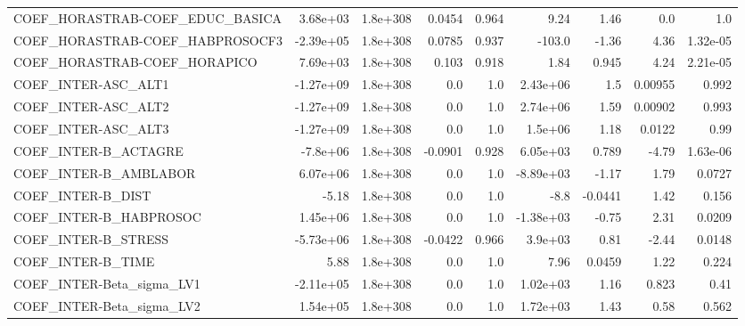 \begin{tabular}{lrrrrrrrr}
COEF\_HORASTRAB-COEF\_EDUC\_BASICA   &    3.68e+03 &     1.8e+308 &  0.0454 &    0.964 &       9.24 &        1.46 &          0.0 &           1.0 \\
COEF\_HORASTRAB-COEF\_HABPROSOCF3   &   -2.39e+05 &     1.8e+308 &  0.0785 &    0.937 &     -103.0 &       -1.36 &         4.36 &      1.32e-05 \\
COEF\_HORASTRAB-COEF\_HORAPICO      &    7.69e+03 &     1.8e+308 &   0.103 &    0.918 &       1.84 &       0.945 &         4.24 &      2.21e-05 \\
COEF\_INTER-ASC\_ALT1               &   -1.27e+09 &     1.8e+308 &     0.0 &      1.0 &   2.43e+06 &         1.5 &      0.00955 &         0.992 \\
COEF\_INTER-ASC\_ALT2               &   -1.27e+09 &     1.8e+308 &     0.0 &      1.0 &   2.74e+06 &        1.59 &      0.00902 &         0.993 \\
COEF\_INTER-ASC\_ALT3               &   -1.27e+09 &     1.8e+308 &     0.0 &      1.0 &    1.5e+06 &        1.18 &       0.0122 &          0.99 \\
COEF\_INTER-B\_ACTAGRE              &    -7.8e+06 &     1.8e+308 & -0.0901 &    0.928 &   6.05e+03 &       0.789 &        -4.79 &      1.63e-06 \\
COEF\_INTER-B\_AMBLABOR             &    6.07e+06 &     1.8e+308 &     0.0 &      1.0 &  -8.89e+03 &       -1.17 &         1.79 &        0.0727 \\
COEF\_INTER-B\_DIST                 &       -5.18 &     1.8e+308 &     0.0 &      1.0 &       -8.8 &     -0.0441 &         1.42 &         0.156 \\
COEF\_INTER-B\_HABPROSOC            &    1.45e+06 &     1.8e+308 &     0.0 &      1.0 &  -1.38e+03 &       -0.75 &         2.31 &        0.0209 \\
COEF\_INTER-B\_STRESS               &   -5.73e+06 &     1.8e+308 & -0.0422 &    0.966 &    3.9e+03 &        0.81 &        -2.44 &        0.0148 \\
COEF\_INTER-B\_TIME                 &        5.88 &     1.8e+308 &     0.0 &      1.0 &       7.96 &      0.0459 &         1.22 &         0.224 \\
COEF\_INTER-Beta\_sigma\_LV1         &   -2.11e+05 &     1.8e+308 &     0.0 &      1.0 &   1.02e+03 &        1.16 &        0.823 &          0.41 \\
COEF\_INTER-Beta\_sigma\_LV2         &    1.54e+05 &     1.8e+308 &     0.0 &      1.0 &   1.72e+03 &        1.43 &         0.58 &         0.562 \\

\end{tabular}
